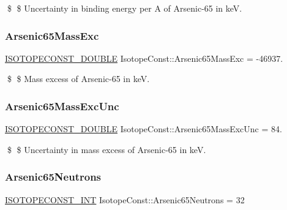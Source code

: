 \$ \$ Uncertainty in binding energy per A of Arsenic-\/65 in keV. \mbox{\label{group___isotope_const-_arsenic-_as65_ga416fed6c282a29e33e7dbb8d1de1c8a7}} 
\subsubsection{\texorpdfstring{Arsenic65\+Mass\+Exc}{Arsenic65MassExc}}
{\footnotesize\ttfamily \mbox{\hyperlink{group___isotope_const-_macros_ga8f45a7272ce02c0b4c65c44636ed719a}{I\+S\+O\+T\+O\+P\+E\+C\+O\+N\+S\+T\+\_\+\+D\+O\+U\+B\+LE}} Isotope\+Const\+::\+Arsenic65\+Mass\+Exc = -\/46937.}

\$ \$ Mass excess of Arsenic-\/65 in keV. \mbox{\label{group___isotope_const-_arsenic-_as65_ga4993ae022a58b07164e3c4afc493ecfa}} 
\subsubsection{\texorpdfstring{Arsenic65\+Mass\+Exc\+Unc}{Arsenic65MassExcUnc}}
{\footnotesize\ttfamily \mbox{\hyperlink{group___isotope_const-_macros_ga8f45a7272ce02c0b4c65c44636ed719a}{I\+S\+O\+T\+O\+P\+E\+C\+O\+N\+S\+T\+\_\+\+D\+O\+U\+B\+LE}} Isotope\+Const\+::\+Arsenic65\+Mass\+Exc\+Unc = 84.}

\$ \$ Uncertainty in mass excess of Arsenic-\/65 in keV. \mbox{\label{group___isotope_const-_arsenic-_as65_ga840042bee347dadd051a3ce0ebc6e340}} 
\subsubsection{\texorpdfstring{Arsenic65\+Neutrons}{Arsenic65Neutrons}}
{\footnotesize\ttfamily \mbox{\hyperlink{group___isotope_const-_macros_ga5f18360b3e99483a35c32d789e62621c}{I\+S\+O\+T\+O\+P\+E\+C\+O\+N\+S\+T\+\_\+\+I\+NT}} Isotope\+Const\+::\+Arsenic65\+Neutrons = 32}

